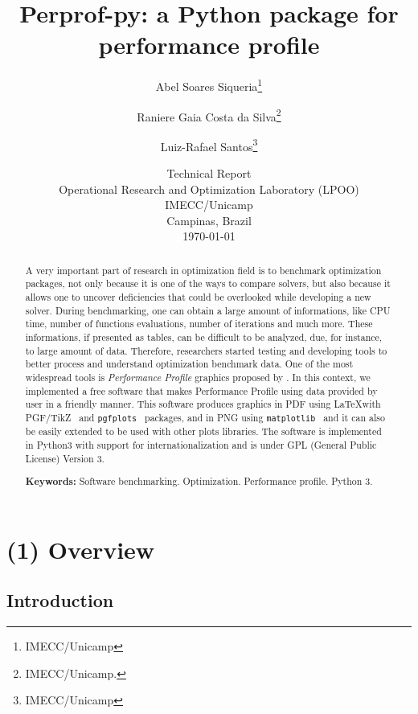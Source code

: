 \documentclass[10pt,a4paper]{article}
\begin{document}
\title{Perprof-py: a {P}ython package for performance profile}
\author{ Abel Soares Siqueria\thanks{IMECC/Unicamp}  \and Raniere Gaia Costa da Silva\thanks{IMECC/Unicamp.} \and Luiz-Rafael Santos\thanks{IMECC/Unicamp}}
\date{Technical Report \\ Operational Research and Optimization Laboratory (LPOO) \\ IMECC/Unicamp \\ Campinas, Brazil \\ \today}
\maketitle

\begin{abstract}
 A very important part of research in optimization field is to benchmark optimization packages,
not only because it is one of the ways to compare solvers, but also because it allows one to uncover
deficiencies that could be overlooked while developing a new solver. During
benchmarking, one can obtain a large amount of  informations, like CPU time, number of functions
evaluations, number of iterations and much more. These informations, if presented
as tables, can be difficult to be analyzed, due, for instance, to large amount of data.
Therefore, researchers started testing and developing tools to better process and understand optimization benchmark
data. One of the most widespread tools is \emph{Performance Profile} graphics
proposed by \textcite{Dolan:2002du}. In this context, we implemented a free software that makes Performance Profile using data provided by user in a friendly manner. This software produces graphics in PDF using \LaTeX with PGF/TikZ~\cite{TikZ} and \texttt{pgfplots}~\cite{pgfplots} packages, and in PNG using \texttt{matplotlib}~\cite{Hunter:2007}
and it can also be easily extended to be used with other plots libraries. The software is
implemented in Python3 with support for internationalization and is under GPL (General Public License) Version 3. %

\textbf{Keywords:} Software benchmarking.  Optimization. Performance profile. Python 3.
\end{abstract}

\section*{(1) Overview}

\subsection*{Introduction}
\end{document}
